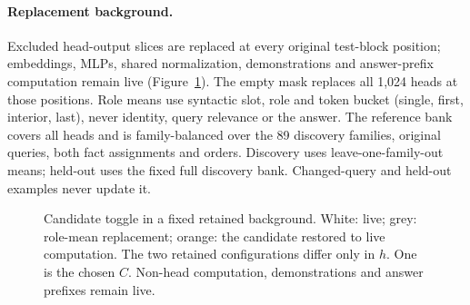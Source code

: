 \paragraph{Replacement background.}
Excluded head-output slices are replaced at every original test-block position;
embeddings, MLPs, shared normalization, demonstrations and answer-prefix
computation remain live (Figure~\ref{fig:retained}). The empty mask replaces all
1,024 heads at those positions. Role means use syntactic slot, role and token
bucket (single, first, interior, last), never identity, query relevance or the
answer. The reference bank covers all heads and is family-balanced over the 89
discovery families, original queries, both fact assignments and orders. Discovery
uses leave-one-family-out means; held-out uses the fixed full discovery bank.
Changed-query and held-out examples never update it.

\begin{figure}[t]
\centering
{}
\caption{Candidate toggle in a fixed retained background. White: live;
grey: role-mean replacement; orange: the candidate restored to live computation.
The two retained configurations differ only in $h$. One is the chosen $C$.
Non-head computation, demonstrations and answer prefixes remain live.}
\label{fig:retained}
\end{figure}


